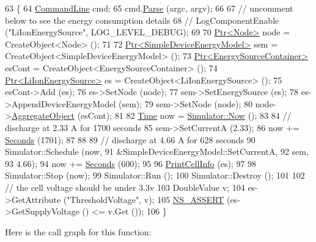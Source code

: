 \begin{DoxyCode}
63 \{
64   \hyperlink{classns3_1_1CommandLine}{CommandLine} cmd;
65   cmd.\hyperlink{classns3_1_1CommandLine_a5c10b85b3207e5ecb48d907966923156}{Parse} (argc, argv);
66   
67     \textcolor{comment}{// uncomment below to see the energy consumption details}
68   \textcolor{comment}{// LogComponentEnable ("LiIonEnergySource", LOG\_LEVEL\_DEBUG);}
69 
70   \hyperlink{classns3_1_1Ptr}{Ptr<Node>} node = CreateObject<Node> ();
71 
72   \hyperlink{classns3_1_1Ptr}{Ptr<SimpleDeviceEnergyModel>} sem = CreateObject<SimpleDeviceEnergyModel> ();
73   \hyperlink{classns3_1_1Ptr}{Ptr<EnergySourceContainer>} esCont = CreateObject<EnergySourceContainer> ();
74   \hyperlink{classns3_1_1Ptr}{Ptr<LiIonEnergySource>} es = CreateObject<LiIonEnergySource> ();
75   esCont->Add (es);
76   es->SetNode (node);
77   sem->SetEnergySource (es);
78   es->AppendDeviceEnergyModel (sem);
79   sem->SetNode (node);
80   node->\hyperlink{classns3_1_1Object_a79dd435d300f3deca814553f561a2922}{AggregateObject} (esCont);
81 
82   \hyperlink{classns3_1_1Time}{Time} now = \hyperlink{group__simulator_gac3635e2e87f7ce316c89290ee1b01d0d}{Simulator::Now} ();
83 
84   \textcolor{comment}{// discharge at 2.33 A for 1700 seconds}
85   sem->SetCurrentA (2.33);
86   now += \hyperlink{group__timecivil_ga33c34b816f8ff6628e33d5c8e9713b9e}{Seconds} (1701);
87 
88 
89   \textcolor{comment}{// discharge at 4.66 A for 628 seconds}
90   Simulator::Schedule (now,
91                        &SimpleDeviceEnergyModel::SetCurrentA,
92                        sem,
93                        4.66);
94   now += \hyperlink{group__timecivil_ga33c34b816f8ff6628e33d5c8e9713b9e}{Seconds} (600);
95 
96   \hyperlink{examples_2li-ion-energy-source_8cc_a5a233214e03143292862c2a936b073eb}{PrintCellInfo} (es);
97 
98   Simulator::Stop (now);
99   Simulator::Run ();
100   Simulator::Destroy ();
101 
102   \textcolor{comment}{// the cell voltage should be under 3.3v}
103   DoubleValue v;
104   es->GetAttribute (\textcolor{stringliteral}{"ThresholdVoltage"}, v);
105   \hyperlink{assert_8h_a6dccdb0de9b252f60088ce281c49d052}{NS\_ASSERT} (es->GetSupplyVoltage () <= v.Get ());
106 \}
\end{DoxyCode}


Here is the call graph for this function\+:


